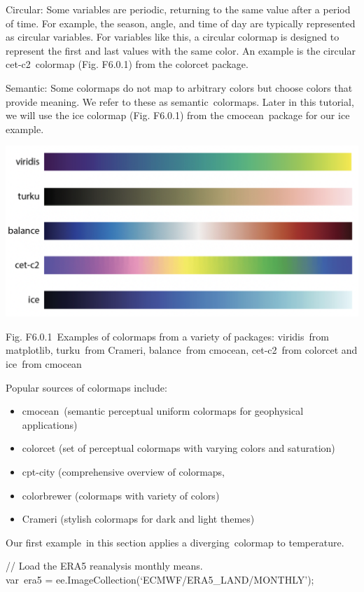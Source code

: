 \documentclass[
  letterpaper,
  DIV=11,
  numbers=noendperiod]{scrreprt}
\providecommand{\tightlist}{%
  \setlength{\itemsep}{0pt}\setlength{\parskip}{0pt}}\usepackage{longtable,booktabs,array}
\begin{document}
Circular: Some variables are periodic, returning to the same value after
a period of time. For example, the season, angle, and time of day are
typically represented as circular variables. For variables like this, a
circular colormap is designed to represent the first and last values
with the same color. An example is the circular cet-c2~colormap (Fig.
F6.0.1) from the colorcet package.

Semantic: Some colormaps do not map to arbitrary colors but choose
colors that provide meaning. We refer to these as semantic~colormaps.
Later in this tutorial, we will use the ice colormap (Fig. F6.0.1) from
the cmocean~package for our ice example.

\includegraphics{./F6/image40.png}

Fig. F6.0.1~Examples of colormaps from a variety of packages:
viridis~from matplotlib, turku~from Crameri, balance~from cmocean,
cet-c2~from colorcet and ice~from cmocean

Popular sources of colormaps include:

\begin{itemize}
\tightlist
\item
  cmocean~(semantic perceptual uniform colormaps for geophysical
  applications)
\item
  colorcet (set of perceptual colormaps with varying colors and
  saturation)
\item
  cpt-city (comprehensive overview of colormaps,
\item
  colorbrewer (colormaps with variety of colors)
\item
  Crameri (stylish colormaps for dark and light themes)
\end{itemize}

Our first example~in this section applies a diverging~colormap to
temperature.

// Load the ERA5 reanalysis monthly means.\\
var~era5 = ee.ImageCollection(`ECMWF/ERA5\_LAND/MONTHLY');
\end{document}
